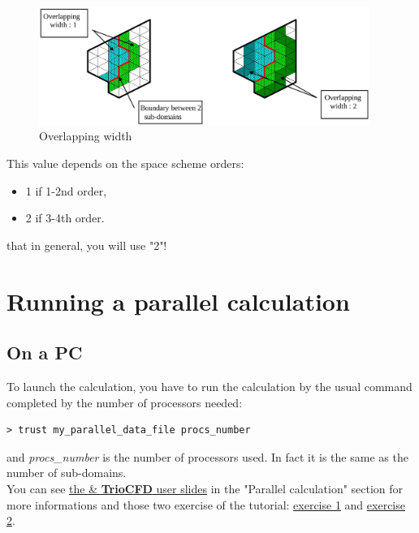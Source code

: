 \begin{figure}[h!]
\begin{center}
\includegraphics[width=0.96\textwidth]{overlap.jpeg}
\caption{Overlapping width}
\label{overlap}
\end{center}
\end{figure}

This value depends on the space scheme orders:
\begin{itemize}
\item 1 if 1-2nd order,
\item 2 if 3-4th order.
\end{itemize}

\Note that in general, you will use "2"!



\section{Running a parallel calculation}

\subsection{On a PC}
To launch the calculation, you have to run the calculation by the usual command completed by the number of processors needed:
\begin{verbatim}
> trust my_parallel_data_file procs_number
\end{verbatim}
and \textit{procs\_number} is the number of processors used. In fact it is the same as the number of sub-domains.\\

You can see \href{TRUST_and_TrioCFD_presentation.pdf}{the \trust \& \textbf{TrioCFD} user slides} in the "Parallel calculation" section for more informations and those two exercise of the \trust tutorial: \href{TRUST_tutorial.pdf\#exo_para_1}{exercise 1} and \href{TRUST_tutorial.pdf\#prm_para}{exercise 2}.

